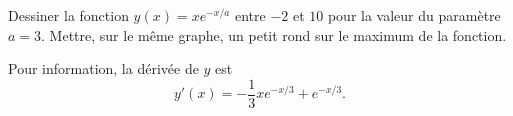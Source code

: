 \begin{exercice}\label{exotestMAT1151-G210001}

	Dessiner la fonction $y(x)=x e^{-x/a}$ entre $-2$ et $10$ pour la valeur du paramètre $a=3$. Mettre, sur le même graphe, un petit rond sur le maximum de la fonction.

	Pour information, la dérivée de $y$ est
	\[ 
		y'(x)=-\frac{1}{ 3 }x e^{-x/3}+ e^{-x/3}.
	\]
		
\end{exercice}
